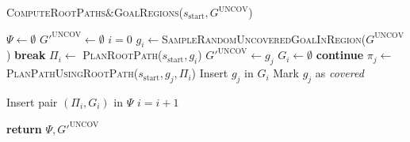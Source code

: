\begin{algorithm}
\caption{\textsc{ComputeRootPaths$\&$GoalRegions}($s_{\textrm{start}}, G^{\textrm{UNCOV}}$)}\label{alg:4}
\begin{algorithmic}[1]
\State $\Psi \leftarrow \emptyset$   
\State $G'^{\textrm{UNCOV}} \leftarrow \emptyset$
\State $i = 0$
    
    \State $g_i \leftarrow$\textsc{SampleRandomUncoveredGoalInRegion}($G^{\textrm{UNCOV}}$)
        \State \textbf{break}
    \EndIf
    \State $\Pi_i \leftarrow$ \textsc{PlanRootPath}($s_{\textrm{start}}, g_i$)
      
        \State $G'^{\textrm{UNCOV}} \leftarrow g_j$
    \EndIf
    \State $G_i \leftarrow \emptyset$
            \State \textbf{continue}
        \EndIf
        \State $\pi_j \leftarrow$\textsc{PlanPathUsingRootPath}($s_{\textrm{start}},g_j,\Pi_i$)
         
            \State Insert $g_j$ in $G_i$
            \State Mark $g_j$ as \emph{covered}
        \EndIf
        
    \EndFor
    \State Insert pair $(\Pi_i, G_i)$ in $\Psi$
    \State $i = i + 1$

\EndWhile
\State \textbf{return} $\Psi, G'^{\textrm{UNCOV}}$
\end{algorithmic}
\end{algorithm}

